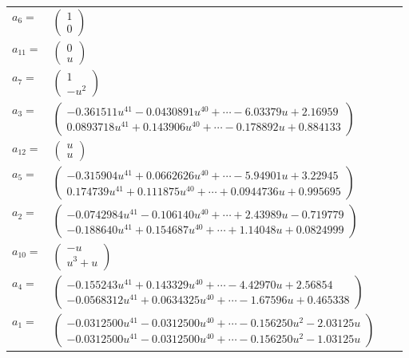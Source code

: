 \documentclass[1p]{elsarticle_modified}
\theoremstyle{definition}
\begin{document}
\begin{tabular}{m{7pt} m{180pt} m{7pt} m{180pt} }
\flushright $a_{6}=$&$\begin{pmatrix}1\\0\end{pmatrix}$ \\
\flushright $a_{11}=$&$\begin{pmatrix}0\\u\end{pmatrix}$ \\
\flushright $a_{7}=$&$\begin{pmatrix}1\\- u^2\end{pmatrix}$ \\
\flushright $a_{3}=$&$\begin{pmatrix}-0.361511 u^{41}-0.0430891 u^{40}+\cdots-6.03379 u+2.16959\\0.0893718 u^{41}+0.143906 u^{40}+\cdots-0.178892 u+0.884133\end{pmatrix}$ \\
\flushright $a_{12}=$&$\begin{pmatrix}u\\u\end{pmatrix}$ \\
\flushright $a_{5}=$&$\begin{pmatrix}-0.315904 u^{41}+0.0662626 u^{40}+\cdots-5.94901 u+3.22945\\0.174739 u^{41}+0.111875 u^{40}+\cdots+0.0944736 u+0.995695\end{pmatrix}$ \\
\flushright $a_{2}=$&$\begin{pmatrix}-0.0742984 u^{41}-0.106140 u^{40}+\cdots+2.43989 u-0.719779\\-0.188640 u^{41}+0.154687 u^{40}+\cdots+1.14048 u+0.0824999\end{pmatrix}$ \\
\flushright $a_{10}=$&$\begin{pmatrix}- u\\u^3+u\end{pmatrix}$ \\
\flushright $a_{4}=$&$\begin{pmatrix}-0.155243 u^{41}+0.143329 u^{40}+\cdots-4.42970 u+2.56854\\-0.0568312 u^{41}+0.0634325 u^{40}+\cdots-1.67596 u+0.465338\end{pmatrix}$ \\
\flushright $a_{1}=$&$\begin{pmatrix}-0.0312500 u^{41}-0.0312500 u^{40}+\cdots-0.156250 u^{2}-2.03125 u\\-0.0312500 u^{41}-0.0312500 u^{40}+\cdots-0.156250 u^{2}-1.03125 u\end{pmatrix}$ \\

\end{tabular}
\end{document}
